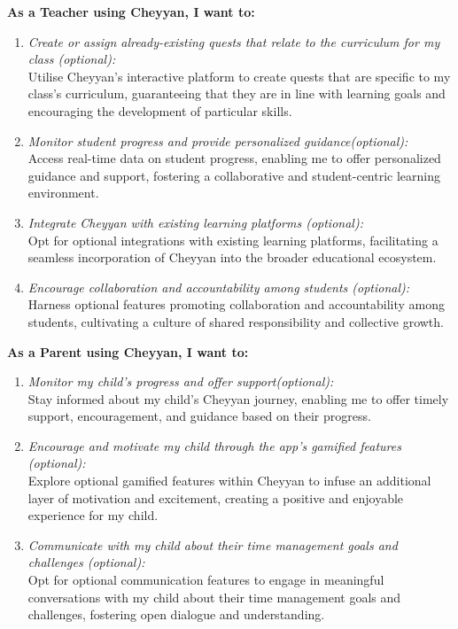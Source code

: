 \documentclass{l4proj}
\begin{document}
\textbf{As a Teacher using Cheyyan, I want to:}

\begin{enumerate}
\item \textit{Create or assign already-existing quests that relate to the curriculum for my class (optional):} \\
        Utilise Cheyyan's interactive platform to create quests that are specific to my class's curriculum, guaranteeing that they are in line with learning goals and encouraging the development of particular skills.
  
 
  \item \textit{Monitor student progress and provide personalized guidance(optional):} \\
        Access real-time data on student progress, enabling me to offer personalized guidance and support, fostering a collaborative and student-centric learning environment.
  
  \item \textit{Integrate Cheyyan with existing learning platforms (optional):} \\
        Opt for optional integrations with existing learning platforms, facilitating a seamless incorporation of Cheyyan into the broader educational ecosystem.
  
  \item \textit{Encourage collaboration and accountability among students (optional):} \\
        Harness optional features promoting collaboration and accountability among students, cultivating a culture of shared responsibility and collective growth.
\end{enumerate}

\textbf{As a Parent using Cheyyan, I want to:}

\begin{enumerate}
  \item \textit{Monitor my child's progress and offer support(optional):} \\
        Stay informed about my child's Cheyyan journey, enabling me to offer timely support, encouragement, and guidance based on their progress.
  
  \item \textit{Encourage and motivate my child through the app's gamified features (optional):} \\
        Explore optional gamified features within Cheyyan to infuse an additional layer of motivation and excitement, creating a positive and enjoyable experience for my child.
  
  \item \textit{Communicate with my child about their time management goals and challenges (optional):} \\
        Opt for optional communication features to engage in meaningful conversations with my child about their time management goals and challenges, fostering open dialogue and understanding.
\end{enumerate}
\end{document}
